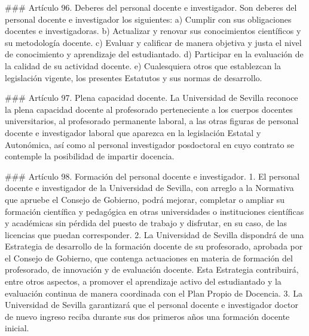 \documentclass{article}
\begin{document}
\begin{itemize}
\begin{itemize}
\begin{scriptsize}
                  \#\#\# Artículo 96. Deberes del personal docente e investigador.
                  Son deberes del personal docente e investigador los siguientes:
                  a) Cumplir con sus obligaciones docentes e investigadoras.
                  b) Actualizar y renovar sus conocimientos científicos y su metodología docente.
                  c) Evaluar y calificar de manera objetiva y justa el nivel de conocimiento y aprendizaje del estudiantado.
                  d) Participar en la evaluación de la calidad de su actividad docente.
                  e) Cualesquiera otros que establezcan la legislación vigente, los presentes Estatutos y sus normas de desarrollo.

                  \#\#\# Artículo 97. Plena capacidad docente.
                  La Universidad de Sevilla reconoce la plena capacidad docente al profesorado perteneciente a los cuerpos docentes universitarios, al profesorado permanente laboral, a las otras figuras de personal docente e investigador laboral que aparezca en la legislación Estatal y Autonómica, así como al personal investigador posdoctoral en cuyo contrato se contemple la posibilidad de impartir docencia.

                  \#\#\# Artículo 98. Formación del personal docente e investigador.
                  1. El personal docente e investigador de la Universidad de Sevilla, con arreglo a la Normativa que apruebe el Consejo de Gobierno, podrá mejorar, completar o ampliar su formación científica y pedagógica en otras universidades o instituciones científicas y académicas sin pérdida del puesto de trabajo y disfrutar, en su caso, de las licencias que puedan corresponder.
                  2. La Universidad de Sevilla dispondrá de una Estrategia de desarrollo de la formación docente de su profesorado, aprobada por el Consejo de Gobierno, que contenga actuaciones en materia de formación del profesorado, de innovación y de evaluación docente. Esta Estrategia contribuirá, entre otros aspectos, a promover el aprendizaje activo del estudiantado y la evaluación continua de manera coordinada con el Plan Propio de Docencia.
                  3. La Universidad de Sevilla garantizará que el personal docente e investigador doctor de nuevo ingreso reciba durante sus dos primeros años una formación docente inicial.


\end{scriptsize}
\end{itemize}
\end{itemize}
\end{document}
